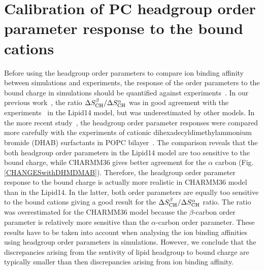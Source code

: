 \documentclass[journal=jpcbfk]{achemso}
\begin{document}
\pagebreak
\section{Calibration of PC headgroup order parameter response to the bound cations}\label{electrometerCALIBRATION}
Before using the headgroup order parameters to compare ion binding affinity between simulations
and experiments, the response of the order parameters to the bound charge in simulations should be quantified
against experiments~\cite{catte16,melcr18}. In our previous work~\cite{catte16},
the ratio $\Delta S_{\rm CH}^\beta / \Delta S_{\rm CH}^\alpha$ was in good agreement with the experiments~\cite{akutsu81}
in the Lipid14 model, but was underestimated by other models. In the more recent study~\cite{melcr18},
the headgroup order parameter responses were compared more carefully with the experiments of
cationic dihexadecyldimethylammonium bromide (DHAB) surfactants in POPC bilayer~\cite{scherer89}.
The comparison reveals that the both headgroup order parameters in the Lipid14 model are too sensitive to the bound charge,
while CHARMM36 gives better agreement for the $\alpha$ carbon (Fig. \ref{CHANGESwithDHMDMAB}).
Therefore, the headgroup order parameter response to the bound charge is actually more realistic
in CHARMM36 model than in the Lipid14. In the latter, both order parameters are equally too 
sensitive to the bound cations giving a good result for the $\Delta S_{\rm CH}^\beta / \Delta S_{\rm CH}^\alpha$ ratio.
The ratio was overestimated for the CHARMM36 model because the $\beta$-carbon order parameter
is relatively more sensitive than the $\alpha$-carbon order parameter. These results have to be taken
into account when analysing the ion binding affinities using headgroup order parameters in simulations.
However, we conclude that the discrepancies arising from the sentivity of lipid headgroup to
bound charge are typically smaller than then discrepancies arising from ion binding affinity.
\end{document}
